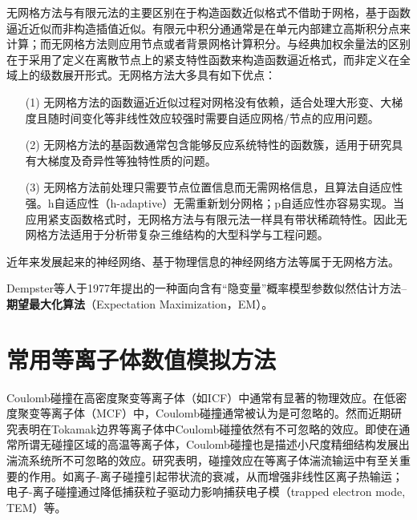 无网格方法与有限元法的主要区别在于构造函数近似格式不借助于网格，基于函数逼近近似而非构造插值近似。有限元中积分通通常是在单元内部建立高斯积分点来计算；而无网格方法则应用节点或者背景网格计算积分。与经典加权余量法的区别在于采用了定义在离散节点上的紧支特性函数来构造函数逼近格式，而非定义在全域上的级数展开形式。无网格方法大多具有如下优点：

\begin{itemize}
\item[(1)] 无网格方法的函数逼近近似过程对网格没有依赖，适合处理大形变、大梯度且随时间变化等非线性效应较强时需要自适应网格/节点的应用问题。
\end{itemize}

\begin{itemize}
\item[(2)] 无网格方法的基函数通常包含能够反应系统特性的函数簇，适用于研究具有大梯度及奇异性等独特性质的问题。
\end{itemize}
 
\begin{itemize}
\item[(3)] 无网格方法前处理只需要节点位置信息而无需网格信息，且算法自适应性强。h自适应性（h-adaptive）无需重新划分网格；p自适应性亦容易实现。当应用紧支函数格式时，无网格方法与有限元法一样具有带状稀疏特性。因此无网格方法适用于分析带复杂三维结构的大型科学与工程问题。
\end{itemize}

近年来发展起来的神经网络、基于物理信息的神经网络方法等属于无网格方法。

Dempster等人于1977年提出的一种面向含有“隐变量”概率模型参数似然估计方法--\textbf{期望最大化算法}（Expectation Maximization，EM）。

\section{常用等离子体数值模拟方法}
\label{常用等离子体数值模拟方法}

  Coulomb碰撞在高密度聚变等离子体（如ICF）中通常有显著的物理效应\cite{Ricketson2014}。在低密度聚变等离子体（MCF）中，Coulomb碰撞通常被认为是可忽略的。然而近期研究表明在Tokamak边界等离子体中Coulomb碰撞依然有不可忽略的效应\cite{Park2010,Koh2012}。即使在通常所谓无碰撞区域的高温等离子体，Coulomb碰撞也是描述小尺度精细结构发展出湍流系统所不可忽略的效应。研究表明，碰撞效应在等离子体湍流输运中有至关重要的作用\cite{Garbet2010}。如离子-离子碰撞引起带状流的衰减，从而增强非线性区离子热输运\cite{Lin1999,Falchetto2004}；电子-离子碰撞通过降低捕获粒子驱动力影响捕获电子模（trapped electron mode, TEM）等\cite{Rewoldt1990}。

